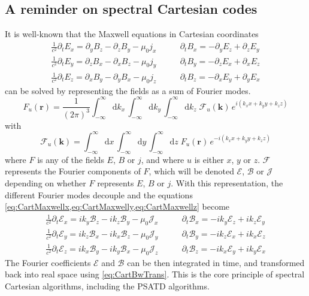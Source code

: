 \documentclass[1p,times]{elsarticle}
\newcommand{\Integ}[1]{\int_{-\infty}^{\infty} \!\!\!\!\!\!
  \mathrm{d}#1}
\renewcommand{\vec}[1]{\boldsymbol{#1}}
\begin{document}
\subsection{A reminder on spectral Cartesian codes}

It is well-known that the Maxwell equations in Cartesian coordinates 
\begin{subequations}
\begin{align}
\frac{1}{c^2}\partial_t E_x = \partial_y B_z - \partial_z B_y - \mu_0  j_x \qquad&   
\partial_t B_x = -\partial_y E_z + \partial_z E_y \label{eq:CartMaxwellx} \\
\frac{1}{c^2}\partial_t E_y = \partial_z B_x - \partial_x B_z - \mu_0  j_y \qquad &   
\partial_t B_y = -\partial_z E_x + \partial_x E_z \label{eq:CartMaxwelly}  \\
\frac{1}{c^2}\partial_t E_z = \partial_x B_y - \partial_y B_x - \mu_0  j_z \qquad &   
\partial_t B_z = -\partial_x E_y + \partial_y E_x \label{eq:CartMaxwellz} 
\end{align}
\end{subequations}
can be solved by representing the fields as a sum of Fourier modes.
\begin{equation}
\label{eq:CartBwTrans}
F_u(\vec{r}) = \frac{1}{(2\pi)^{3}}\Integ{k_x} \,\Integ{k_y}\,
\Integ{k_z} \; \mathcal{F}_u(\vec{k}) \, e^{i(k_x x + k_y y + k_z z)} 
\end{equation}
with 
\begin{equation}
\label{eq:CartFwTrans}
\mathcal{F}_u(\vec{k})  = \Integ{x} \,\Integ{y}\, \Integ{z} \;
F_u(\vec{r}) \, e^{-i(k_x x + k_y y + k_z z)} 
\end{equation}
where $F$ is any of the fields $E$, $B$ or $j$, and where $u$ is
either $x$, $y$ or $z$. $\mathcal{F}$ represents the Fourier
components of $F$, which will be denoted
$\mathcal{E}$, $\mathcal{B}$ or $\mathcal{J}$ depending on whether
$F$ represents $E$, $B$ or $j$. With this representation, the
different Fourier modes decouple and the equations 
\cref{eq:CartMaxwellx,eq:CartMaxwelly,eq:CartMaxwellz} become 
\begin{subequations}
\begin{align}
\frac{1}{c^2}\partial_t \mathcal{E}_x = ik_y \mathcal{B}_z - ik_z \mathcal{B}_y - \mu_0 \mathcal{J}_x \qquad &   
\partial_t \mathcal{B}_x = -ik_y \mathcal{E}_z + ik_z \mathcal{E}_y \label{eq:CartSpectMaxwellx}\\
\frac{1}{c^2}\partial_t \mathcal{E}_y = ik_z \mathcal{B}_x - ik_x \mathcal{B}_z - \mu_0  \mathcal{J}_y \qquad &   
\partial_t \mathcal{B}_y = -ik_z \mathcal{E}_x + ik_x \mathcal{E}_z \label{eq:CartSpectMaxwelly}\\
\frac{1}{c^2}\partial_t \mathcal{E}_z = ik_x \mathcal{B}_y - ik_y \mathcal{B}_x - \mu_0 \mathcal{J}_z  \qquad &   
\partial_t \mathcal{B}_z = -ik_x \mathcal{E}_y + ik_y \mathcal{E}_x \label{eq:CartSpectMaxwellz}
\end{align}
\end{subequations}
The Fourier coefficients $\mathcal{E}$ and $\mathcal{B}$ can be then integrated in time, and
transformed back into real space using \cref{eq:CartBwTrans}. This is
the core principle of spectral Cartesian algorithms, including the PSATD algorithms.
\end{document}
